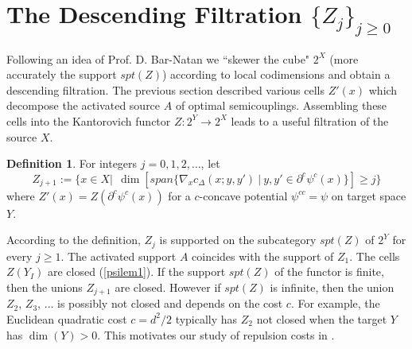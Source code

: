 \documentclass[12pt]{amsart}
\theoremstyle{definition}
\newtheorem{dfn}{Definition}
\theoremstyle{remark}
\newcommand{\del}{\partial}
\newcommand{\cd}{c_\Delta}
\begin{document}













\section{The Descending Filtration $\{Z_j\}_{j\geq 0}$}\label{ksf}
Following an idea of Prof. D. Bar-Natan \cite{Bar2002} we ``skewer the cube" $2^X$ (more accurately the support $spt(Z)$) according to local codimensions and obtain a descending filtration. The previous section described various cells $Z'(x)$ which decompose the activated source $A$ of optimal semicouplings. Assembling these cells into the Kantorovich functor $Z: 2^Y \to 2^X$ leads to a useful filtration of the source $X$. 

\begin{dfn}\label{dimdef}
For integers $j=0,1,2,\ldots$, let $$Z_{j+1}:=\{x \in X | ~~  \dim[span\{\nabla_x \cd(x; y, y') ~|~ y,y' \in \del^c \psi^c (x)\}] \geq j\}$$ where $Z'(x)=Z(\del^c \psi^c (x))$ for a $c$-concave potential $\psi^{cc}=\psi$ on target space $Y$.
\end{dfn}
According to the definition, $Z_j$ is supported on the subcategory $spt(Z)$ of $2^Y$ for every $j\geq 1$. The activated support $A$ coincides with the support of $Z_1$. The cells $Z(Y_I)$ are closed (\ref{psilem1}). If the support $spt(Z)$ of the functor is finite, then the unions $Z_{j+1}$ are closed. However if $spt(Z)$ is infinite, then the union $Z_2$, $Z_3$, $\ldots$ is possibly not closed and depends on the cost $c$. For example, the Euclidean quadratic cost $c=d^2/2$ typically has $Z_2$ not closed when the target $Y$ has $\dim(Y)>0$. This motivates our study of repulsion costs in \cite[Ch.4]{martel}. 








\end{document}
